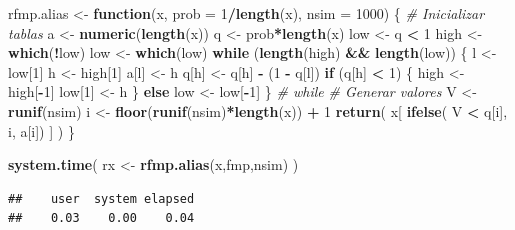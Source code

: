 \documentclass[
]{book}
\newenvironment{Shaded}{\begin{snugshade}}{\end{snugshade}}
\newcommand{\CommentTok}[1]{\textcolor[rgb]{0.56,0.35,0.01}{\textit{#1}}}
\newcommand{\ControlFlowTok}[1]{\textcolor[rgb]{0.13,0.29,0.53}{\textbf{#1}}}
\newcommand{\DataTypeTok}[1]{\textcolor[rgb]{0.13,0.29,0.53}{#1}}
\newcommand{\DecValTok}[1]{\textcolor[rgb]{0.00,0.00,0.81}{#1}}
\newcommand{\KeywordTok}[1]{\textcolor[rgb]{0.13,0.29,0.53}{\textbf{#1}}}
\newcommand{\NormalTok}[1]{#1}
\newcommand{\OperatorTok}[1]{\textcolor[rgb]{0.81,0.36,0.00}{\textbf{#1}}}
\newcommand{\StringTok}[1]{\textcolor[rgb]{0.31,0.60,0.02}{#1}}
\theoremstyle{break}
\theoremstyle{definition}
\theoremstyle{definition}
\theoremstyle{definition}
\theoremstyle{remark}
\begin{document}
\begin{Shaded}
\begin{Highlighting}[]
\NormalTok{rfmp.alias <-}\StringTok{ }\ControlFlowTok{function}\NormalTok{(x, }\DataTypeTok{prob =} \DecValTok{1}\OperatorTok{/}\KeywordTok{length}\NormalTok{(x), }\DataTypeTok{nsim =} \DecValTok{1000}\NormalTok{) \{}
  \CommentTok{# Inicializar tablas}
\NormalTok{  a <-}\StringTok{ }\KeywordTok{numeric}\NormalTok{(}\KeywordTok{length}\NormalTok{(x))}
\NormalTok{  q <-}\StringTok{ }\NormalTok{prob}\OperatorTok{*}\KeywordTok{length}\NormalTok{(x)}
\NormalTok{  low <-}\StringTok{ }\NormalTok{q }\OperatorTok{<}\StringTok{ }\DecValTok{1}
\NormalTok{  high <-}\StringTok{ }\KeywordTok{which}\NormalTok{(}\OperatorTok{!}\NormalTok{low)}
\NormalTok{  low <-}\StringTok{ }\KeywordTok{which}\NormalTok{(low)}
  \ControlFlowTok{while}\NormalTok{ (}\KeywordTok{length}\NormalTok{(high) }\OperatorTok{&&}\StringTok{ }\KeywordTok{length}\NormalTok{(low)) \{}
\NormalTok{    l <-}\StringTok{ }\NormalTok{low[}\DecValTok{1}\NormalTok{]}
\NormalTok{    h <-}\StringTok{ }\NormalTok{high[}\DecValTok{1}\NormalTok{]}
\NormalTok{    a[l] <-}\StringTok{ }\NormalTok{h}
\NormalTok{    q[h] <-}\StringTok{ }\NormalTok{q[h] }\OperatorTok{-}\StringTok{ }\NormalTok{(}\DecValTok{1} \OperatorTok{-}\StringTok{ }\NormalTok{q[l])}
    \ControlFlowTok{if}\NormalTok{ (q[h] }\OperatorTok{<}\StringTok{ }\DecValTok{1}\NormalTok{) \{}
\NormalTok{      high <-}\StringTok{ }\NormalTok{high[}\OperatorTok{-}\DecValTok{1}\NormalTok{]}
\NormalTok{      low[}\DecValTok{1}\NormalTok{] <-}\StringTok{ }\NormalTok{h}
\NormalTok{    \} }\ControlFlowTok{else}\NormalTok{ low <-}\StringTok{ }\NormalTok{low[}\OperatorTok{-}\DecValTok{1}\NormalTok{]}
\NormalTok{  \} }\CommentTok{# while}
  \CommentTok{# Generar valores}
\NormalTok{  V <-}\StringTok{ }\KeywordTok{runif}\NormalTok{(nsim)}
\NormalTok{  i <-}\StringTok{ }\KeywordTok{floor}\NormalTok{(}\KeywordTok{runif}\NormalTok{(nsim)}\OperatorTok{*}\KeywordTok{length}\NormalTok{(x)) }\OperatorTok{+}\StringTok{ }\DecValTok{1}
  \KeywordTok{return}\NormalTok{( x[ }\KeywordTok{ifelse}\NormalTok{( V }\OperatorTok{<}\StringTok{ }\NormalTok{q[i], i, a[i]) ] )}
\NormalTok{\}}


\KeywordTok{system.time}\NormalTok{( rx <-}\StringTok{ }\KeywordTok{rfmp.alias}\NormalTok{(x,fmp,nsim) )}
\end{Highlighting}
\end{Shaded}

\begin{verbatim}
##    user  system elapsed 
##    0.03    0.00    0.04
\end{verbatim}
\end{document}
